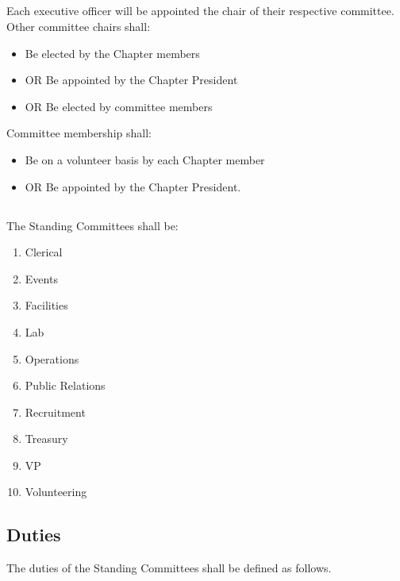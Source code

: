 \documentclass[10pt, oneside]{article}
\begin{document}
\subsection{}
Each executive officer will be appointed the chair of their respective committee. Other committee chairs shall:
\begin{itemize}
    \item Be elected by the Chapter members
    \item OR Be appointed by the Chapter President
    \item OR Be elected by committee members
\end{itemize}

Committee membership shall:
\begin{itemize}
    \item Be on a volunteer basis by each Chapter member
    \item OR Be appointed by the Chapter President.
\end{itemize}

\subsection{ } \label{committees}
The Standing Committees shall be:
\begin{enumerate}[label=\alph*.]
    \item Clerical
    \item Events
    \item Facilities
    \item Lab
    \item Operations
    \item Public Relations
    \item Recruitment
    \item Treasury
    \item VP
    \item Volunteering
\end{enumerate}

\subsection{Duties}
The duties of the Standing Committees shall be defined as follows.
\end{document}
